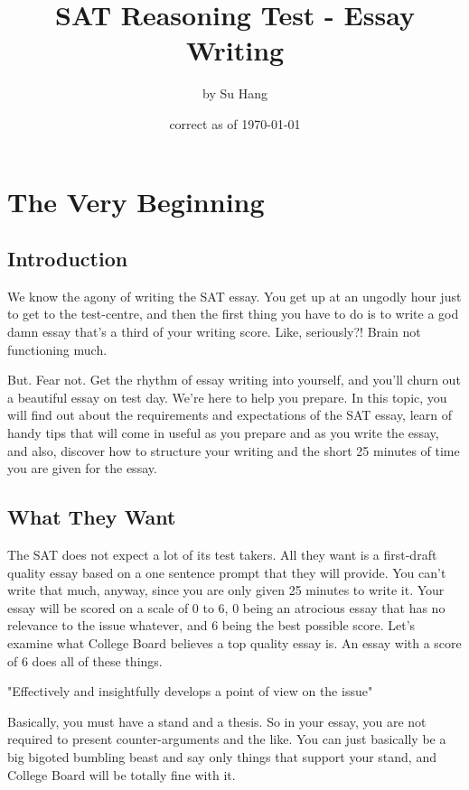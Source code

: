\RequirePackage{../../dominatrix}
\title{SAT Reasoning Test - Essay Writing}
\author{\large by Su Hang}
\date{\small correct as of \today}

\maketitle
\tableofcontents
\section{The Very Beginning}
\subsection{Introduction}
We know the agony of writing the SAT essay. You get up at an ungodly hour just to get to the test-centre, and then the first thing you have to do is to write a god damn essay that's a third of your writing score. Like, seriously?! Brain not functioning much.

But. Fear not. Get the rhythm of essay writing into yourself, and you'll churn out a beautiful essay on test day. We're here to help you prepare. In this topic, you will find out about the requirements and expectations of the SAT essay, learn of handy tips that will come in useful as you prepare and as you write the essay, and also, discover how to structure your writing and the short 25 minutes of time you are given for the essay.
\subsection{What They Want}
The SAT does not expect a lot of its test takers. All they want is a first-draft quality essay based on a one sentence prompt that they will provide. You can't write that much, anyway, since you are only given 25 minutes to write it. Your essay will be scored on a scale of 0 to 6, 0 being an atrocious essay that has no relevance to the issue whatever, and 6 being the best possible score. Let's examine what College Board believes a top quality essay is. An essay with a score of 6 does all of these things.

"Effectively and insightfully develops a point of view on the issue"

Basically, you must have a stand and a thesis. So in your essay, you are not required to present counter-arguments and the like. You can just basically be a big bigoted bumbling beast and say only things that support your stand, and College Board will be totally fine with it.

